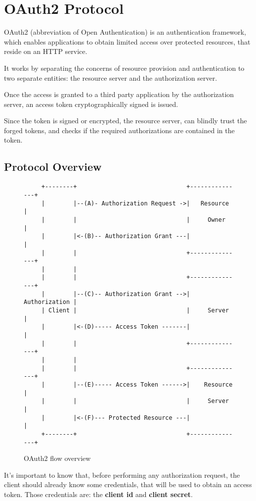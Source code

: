 
\section{OAuth2 Protocol}
OAuth2 (abbreviation of Open Authentication) is an authentication framework,
which enables applications to obtain limited access over protected resources,
that reside on an HTTP service.

It works by separating the concerns of resource provision and authentication to
two separate entities: the resource server and the authorization server.

Once the access is granted to a third party application by the authorization server,
an access token cryptographically signed is issued.

Since the token is signed or encrypted, the resource server, can blindly trust
the forged tokens, and checks if the required authorizations are contained in
the token.

\subsection{Protocol Overview}
\begin{figure}[h]
    \centering
    \begin{BVerbatim}
     +--------+                               +---------------+
     |        |--(A)- Authorization Request ->|   Resource    |
     |        |                               |     Owner     |
     |        |<-(B)-- Authorization Grant ---|               |
     |        |                               +---------------+
     |        |
     |        |                               +---------------+
     |        |--(C)-- Authorization Grant -->| Authorization |
     | Client |                               |     Server    |
     |        |<-(D)----- Access Token -------|               |
     |        |                               +---------------+
     |        |
     |        |                               +---------------+
     |        |--(E)----- Access Token ------>|    Resource   |
     |        |                               |     Server    |
     |        |<-(F)--- Protected Resource ---|               |
     +--------+                               +---------------+
    \end{BVerbatim}
    \caption{OAuth2 flow overview}
    \label{fig:oauth-flow-overview}
\end{figure}
It's important to know that, before performing any authorization request, the
client should already know some credentials, that will be used to obtain an access token.
Those credentials are: the \textbf{client id} and \textbf{client secret}.

